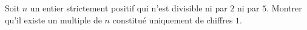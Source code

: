 Soit $n$ un entier strictement positif qui n'est divisible ni par $2$ ni par $5$.
Montrer qu'il existe un multiple de $n$ constitué uniquement de chiffres $1$.
